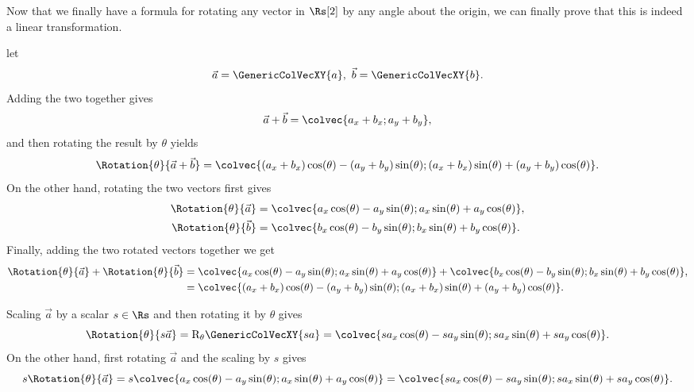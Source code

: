 Now that we finally have a formula for rotating any vector in $\Rs[2]$ by any angle about the origin, we can finally prove that this is indeed a linear transformation.
\begin{descitemize}
	\item[Additivity] let
	\begin{equation*}
		\vec{a}=\GenericColVecXY{a},\ \vec{b}=\GenericColVecXY{b}.
	\end{equation*}
	Adding the two together gives
	\begin{equation*}
		\vec{a}+\vec{b} = \colvec{a_{x}+b_{x};a_{y}+b_{y}},
	\end{equation*}
	and then rotating the result by $\theta$ yields
	\begin{equation*}
		\Rotation{\theta}{\vec{a}+\vec{b}} = \colvec{\left(a_{x}+b_{x}\right)\cos(\theta)-\left(a_{y}+b_{y}\right)\sin(\theta);\left(a_{x}+b_{x}\right)\sin(\theta)+\left(a_{y}+b_{y}\right)\cos(\theta)}.
	\end{equation*}
	On the other hand, rotating the two vectors first gives
	\begin{align*}
		\Rotation{\theta}{\vec{a}} & = \colvec{a_{x}\cos(\theta)-a_{y}\sin(\theta);a_{x}\sin(\theta)+a_{y}\cos(\theta)}, \\
		\Rotation{\theta}{\vec{b}} & = \colvec{b_{x}\cos(\theta)-b_{y}\sin(\theta);b_{x}\sin(\theta)+b_{y}\cos(\theta)}.
	\end{align*}
	Finally, adding the two rotated vectors together we get
	\begin{align*}
		\Rotation{\theta}{\vec{a}} + \Rotation{\theta}{\vec{b}} & = \colvec{a_{x}\cos(\theta)-a_{y}\sin(\theta);a_{x}\sin(\theta)+a_{y}\cos(\theta)} + \colvec{b_{x}\cos(\theta)-b_{y}\sin(\theta);b_{x}\sin(\theta)+b_{y}\cos(\theta)}, \\
		                                                        & = \colvec{\left(a_{x}+b_{x}\right)\cos(\theta)-\left(a_{y}+b_{y}\right)\sin(\theta);\left(a_{x}+b_{x}\right)\sin(\theta)+\left(a_{y}+b_{y}\right)\cos(\theta)}.
	\end{align*}

	\item[Homogeneity] Scaling $\vec{a}$ by a scalar $s\in\Rs$ and then rotating it by $\theta$ gives
	\begin{equation*}
		\Rotation{\theta}{s\vec{a}} = \text{R}_{\theta}\GenericColVecXY{sa} = \colvec{s a_{x}\cos(\theta)-s a_{y}\sin(\theta);s a_{x}\sin(\theta)+s a_{y}\cos(\theta)}.
	\end{equation*}
	On the other hand, first rotating $\vec{a}$ and the scaling by $s$ gives
	\begin{equation*}
		s\Rotation{\theta}{\vec{a}} = s\colvec{a_{x}\cos(\theta)-a_{y}\sin(\theta);a_{x}\sin(\theta)+a_{y}\cos(\theta)} = \colvec{s a_{x}\cos(\theta)-s a_{y}\sin(\theta);s a_{x}\sin(\theta)+s a_{y}\cos(\theta)}.
	\end{equation*}
\end{descitemize}

